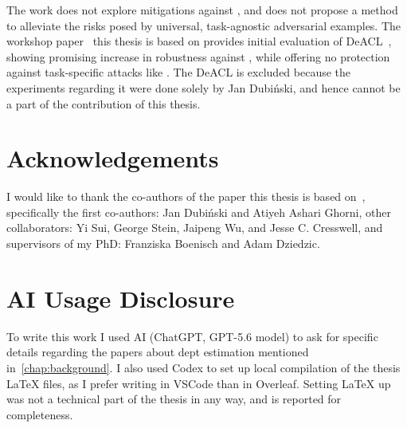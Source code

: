 The work does not explore mitigations against \EmbedAttack, and does not propose a method to alleviate the risks posed by universal, task-agnostic adversarial examples. The workshop paper~\cite{embedatk} this thesis is based on provides initial evaluation of DeACL~\cite{deacl}, showing promising increase in robustness against \EmbedAttack, while offering no protection against task-specific attacks like \PGD. The DeACL is excluded because the experiments regarding it were done solely by Jan Dubiński, and hence cannot be a part of the contribution of this thesis.

\section{Acknowledgements}

I would like to thank the co-authors of the paper this thesis is based on~\cite{embedatk}, specifically the first co-authors: Jan Dubiński and Atiyeh Ashari Ghorni, other collaborators: Yi Sui, George Stein, Jaipeng Wu, and Jesse C. Cresswell, and supervisors of my PhD: Franziska Boenisch and Adam Dziedzic.

\section{AI Usage Disclosure}

To write this work I used AI (ChatGPT, GPT-5.6 model) to ask for specific details regarding the papers about dept estimation mentioned in~\cref{chap:background}. I also used Codex to set up local compilation of the thesis LaTeX files, as I prefer writing in VSCode than in Overleaf. Setting LaTeX up was not a technical part of the thesis in any way, and is reported for completeness.